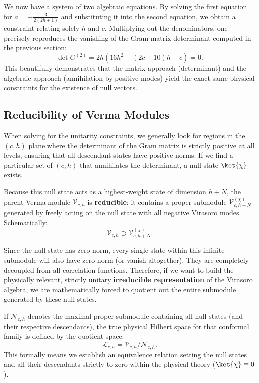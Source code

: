 We now have a system of two algebraic equations. By solving the first equation for \(a = -\frac{3}{2(2h+1)}\) and substituting it into the second equation, we obtain a constraint relating solely \(h\) and \(c\). Multiplying out the denominators, one precisely reproduces the vanishing of the Gram matrix determinant computed in the previous section:
\[
    \det G^{(2)} = 2h \left( 16h^2 + (2c-10)h + c \right) = 0.
\]
This beautifully demonstrates that the matrix approach (determinant) and the algebraic approach (annihilation by positive modes) yield the exact same physical constraints for the existence of null vectors.

\subsection{Reducibility of Verma Modules}

When solving for the unitarity constraints, we generally look for regions in the \((c, h)\) plane where the determinant of the Gram matrix is strictly positive at all levels, ensuring that all descendant states have positive norms. If we find a particular set of \((c, h)\) that annihilates the determinant, a null state \(\ket{\chi}\) exists.

Because this null state acts as a highest-weight state of dimension \(h+N\), the parent Verma module \(\mathcal{V}_{c,h}\) is \textbf{reducible}: it contains a proper submodule \(\mathcal{V}_{c,h+N}^{(\chi)}\) generated by freely acting on the null state with all negative Virasoro modes. Schematically:
\[
    \mathcal{V}_{c,h} \supset \mathcal{V}_{c,h+N}^{(\chi)}.
\]

Since the null state has zero norm, every single state within this infinite submodule will also have zero norm (or vanish altogether). They are completely decoupled from all correlation functions. Therefore, if we want to build the physically relevant, strictly unitary \textbf{irreducible representation} of the Virasoro algebra, we are mathematically forced to quotient out the entire submodule generated by these null states.

If \(\mathcal{N}_{c,h}\) denotes the maximal proper submodule containing all null states (and their respective descendants), the true physical Hilbert space for that conformal family is defined by the quotient space:
\[
    \mathcal{L}_{c,h} = \mathcal{V}_{c,h} / \mathcal{N}_{c,h}.
\]
This formally means we establish an equivalence relation setting the null states and all their descendants strictly to zero within the physical theory (\(\ket{\chi} \equiv 0\)).


